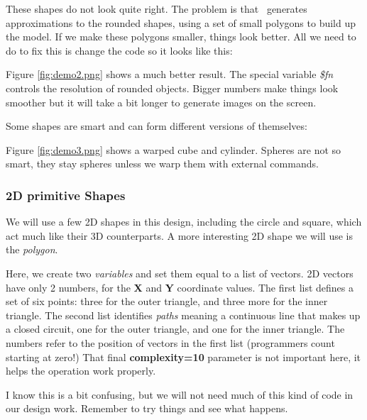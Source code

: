 These shapes do not look quite right. The problem is that \osc\  generates
approximations to the rounded shapes, using a set of small polygons to build up
the model. If we make these polygons smaller, things look better. All we need
to do to fix this is change the code so it looks like this:


Figure \ref{fig:demo2.png} shows a much better result. The special variable
{\it \$fn} controls the resolution of rounded objects. Bigger numbers make
things look smoother but it will take a bit longer to generate images on the screen.


Some shapes are smart and can form different versions of themselves:


Figure \ref{fig:demo3.png} shows a warped cube and cylinder. Spheres are not so
smart, they stay spheres unless we warp them with external commands.



\subsubsection{2D primitive Shapes}

We will use a few 2D shapes in this design, including the circle and square,
which act much like their 3D counterparts. A more interesting 2D shape we will
use is the {\it polygon}.


Here, we create two {\it variables} and set them equal to a list of vectors. 2D
vectors have only 2 numbers, for the {\bf X} and {\bf Y} coordinate values. The
first list defines a set of six points: three for the outer triangle, and three
more for the inner triangle. The second list identifies {\it paths} meaning a
continuous line that makes up a closed circuit, one for the outer triangle, and
one for the inner triangle. The numbers refer to the position of vectors in the
first list (programmers count starting at zero!) That final {\bf complexity=10}
parameter is not important here, it helps the operation work properly.

I know this is a bit confusing, but we will not need much of this kind of code
in our design work. Remember to try things and see what happens.



